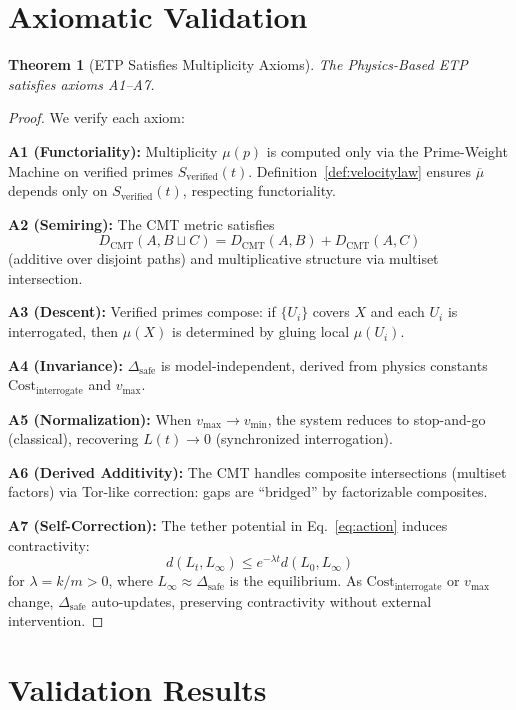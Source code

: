 \documentclass[12pt,a4paper]{article}
\newtheorem{theorem}{Theorem}[section]
\begin{document}
\section{Axiomatic Validation}
\label{sec:axioms}

\begin{theorem}[ETP Satisfies Multiplicity Axioms]
The Physics-Based ETP satisfies axioms A1--A7.
\end{theorem}

\begin{proof}
We verify each axiom:

\textbf{A1 (Functoriality):} Multiplicity $\mu(p)$ is computed only via the Prime-Weight Machine on verified primes $S_{\text{verified}}(t)$. Definition~\ref{def:velocitylaw} ensures $\overline{\mu}$ depends only on $S_{\text{verified}}(t)$, respecting functoriality.

\textbf{A2 (Semiring):} The CMT metric satisfies
\[
D_{\text{CMT}}(A, B \sqcup C) = D_{\text{CMT}}(A, B) + D_{\text{CMT}}(A, C)
\]
(additive over disjoint paths) and multiplicative structure via multiset intersection.

\textbf{A3 (Descent):} Verified primes compose: if $\{U_i\}$ covers $X$ and each $U_i$ is interrogated, then $\mu(X)$ is determined by gluing local $\mu(U_i)$.

\textbf{A4 (Invariance):} $\Delta_{\text{safe}}$ is model-independent, derived from physics constants $\text{Cost}_{\text{interrogate}}$ and $v_{\max}$.

\textbf{A5 (Normalization):} When $v_{\max} \to v_{\min}$, the system reduces to stop-and-go (classical), recovering $L(t) \to 0$ (synchronized interrogation).

\textbf{A6 (Derived Additivity):} The CMT handles composite intersections (multiset factors) via Tor-like correction: gaps are ``bridged'' by factorizable composites.

\textbf{A7 (Self-Correction):} The tether potential in Eq.~\eqref{eq:action} induces contractivity:
\[
d(L_t, L_\infty) \le e^{-\lambda t} d(L_0, L_\infty)
\]
for $\lambda = k / m > 0$, where $L_\infty \approx \Delta_{\text{safe}}$ is the equilibrium. As $\text{Cost}_{\text{interrogate}}$ or $v_{\max}$ change, $\Delta_{\text{safe}}$ auto-updates, preserving contractivity without external intervention.
\end{proof}

\section{Validation Results}
\label{sec:validation}
\end{document}
